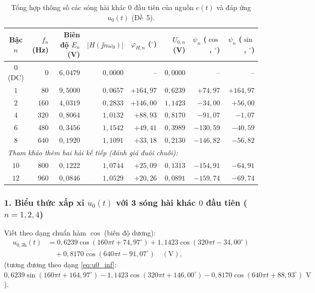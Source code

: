 \begin{table}[!htbp]
    \centering
    \caption{Tổng hợp thông số các sóng hài khác $0$ đầu tiên của nguồn $e(t)$ và đáp ứng $u_0(t)$ (Đề~5).}
    \label{tab:harmonics}
    \vspace{4pt}
    \small
    \begin{tabular}{|c|r|r|r|r|r|r|r|}
        \toprule
        \textbf{Bậc $n$} & \textbf{$f_n$ (Hz)} & \textbf{Biên độ $E_n$ (V)} & \textbf{$|H(\jj n\omega_0)|$} & \textbf{$\varphi_{H,n}$ ($^\circ$)} & \textbf{$U_{0,n}$ (V)} & \textbf{$\psi_n$ ($\cos$, $^\circ$)} & \textbf{$\psi_n$ ($\sin$, $^\circ$)} \\
        \midrule
        $0$ (DC) & $0$   & $6{,}0479$ & $0{,}0000$ & --          & $0{,}0000$ & --          & -- \\
        \hline
        $1$      & $80$  & $9{,}5000$ & $0{,}0657$ & $+164{,}97$ & $0{,}6239$ & $+74{,}97$  & $+164{,}97$ \\
        $2$      & $160$ & $4{,}0319$ & $0{,}2833$ & $+146{,}00$ & $1{,}1423$ & $-34{,}00$  & $+56{,}00$  \\
        $4$      & $320$ & $0{,}8064$ & $1{,}0132$ & $+88{,}93$  & $0{,}8170$ & $-91{,}07$  & $-1{,}07$   \\
        \hline
        $6$      & $480$ & $0{,}3456$ & $1{,}1542$ & $+49{,}41$  & $0{,}3989$ & $-130{,}59$ & $-40{,}59$  \\
        $8$      & $640$ & $0{,}1920$ & $1{,}1091$ & $+33{,}18$  & $0{,}2130$ & $-146{,}82$ & $-56{,}82$  \\
        \hline
        \multicolumn{8}{|l|}{\textit{Tham khảo thêm hai hài kế tiếp (đánh giá đuôi chuỗi):}} \\
        $10$     & $800$ & $0{,}1222$ & $1{,}0744$ & $+25{,}09$  & $0{,}1313$ & $-154{,}91$ & $-64{,}91$  \\
        $12$     & $960$ & $0{,}0846$ & $1{,}0529$ & $+20{,}26$  & $0{,}0891$ & $-159{,}74$ & $-69{,}74$  \\
        \bottomrule
    \end{tabular}
\end{table}

\subsubsection*{1. Biểu thức xấp xỉ $u_0(t)$ với 3 sóng hài khác $0$ đầu tiên ($n = 1, 2, 4$)}
Viết theo dạng chuẩn hàm $\cos$ (biên độ dương):
\begin{align}
    u_{0,3\text{h}}(t)
    &= 0{,}6239\cos(160\pi t + 74{,}97^\circ)
     + 1{,}1423\cos(320\pi t - 34{,}00^\circ) \nonumber\\
    &\quad + 0{,}8170\cos(640\pi t - 91{,}07^\circ) \quad (\text{V}),
    \label{eq:u0_3h}
\end{align}
(tương đương theo dạng \eqref{eq:u0_inf}: $0{,}6239\sin(160\pi t + 164{,}97^\circ) - 1{,}1423\cos(320\pi t + 146{,}00^\circ) - 0{,}8170\cos(640\pi t + 88{,}93^\circ)\text{ V}$).

